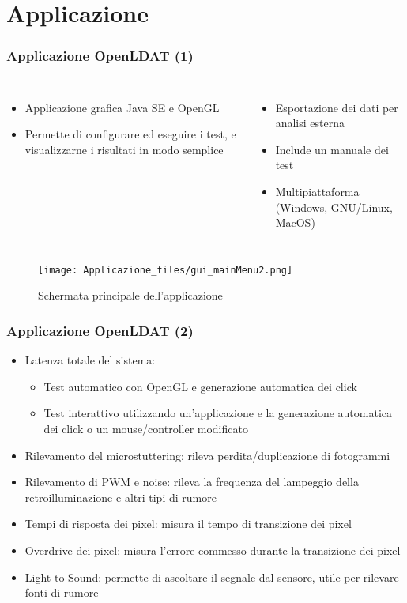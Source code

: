\documentclass[xcolor={x11names}]{beamer}
\begin{document}
\section{Applicazione}
\begin{frame}[shrink=15]
	\frametitle{Applicazione OpenLDAT (1)}
	\begin{columns}
		\begin{itemize}
			\item \alert{Applicazione grafica} Java SE e OpenGL
			\item Permette di \alert{configurare ed eseguire i test, e visualizzarne i risultati} in modo semplice
		\end{itemize}
		\begin{itemize}
			\item \alert{Esportazione dei dati} per analisi esterna
			\item \alert{Include un manuale} dei test
			\item \alert{Multipiattaforma} (Windows, GNU/Linux, MacOS)
		\end{itemize}
	\end{columns}
	\begin{figure}
		\texttt{[image: Applicazione\_files/gui\_mainMenu2.png]}
		\caption*{Schermata principale dell'applicazione}
	\end{figure}
\end{frame}
\begin{frame}[shrink=3]
	\frametitle{Applicazione OpenLDAT (2)}
	\begin{itemize}
		\item \alert{Latenza totale del sistema}:\begin{itemize}
			\item \alert{Test automatico} con OpenGL e generazione automatica dei click
			\item \alert{Test interattivo} utilizzando un'applicazione e la generazione automatica dei click o un mouse/controller modificato
		\end{itemize}
		\item \alert{Rilevamento del microstuttering}: rileva perdita/duplicazione di fotogrammi
		\item \alert{Rilevamento di PWM e noise}: rileva la frequenza del lampeggio della retroilluminazione e altri tipi di rumore
		\item \alert{Tempi di risposta dei pixel}: misura il tempo di transizione dei pixel
		\item \alert{Overdrive dei pixel}: misura l'errore commesso durante la transizione dei pixel
		\item \alert{Light to Sound}: permette di ascoltare il segnale dal sensore, utile per rilevare fonti di rumore
	\end{itemize}
\end{frame}
\end{document}
